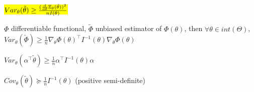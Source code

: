 \begin{cor}
    \hl{$Var_{\theta}(\tilde\theta) \geq \frac{(\dv{\theta}\mathbb{E}_{\theta}(\tilde\theta))^2}{nI(\theta)}$}
\end{cor}

\begin{prop}
    $\Phi$ differentiable functional, $\tilde\Phi$ unbiased estimator of $\Phi(\theta)$, then $\forall \theta \in int(\Theta)$,
    $Var_\theta(\tilde\Phi) \geq \frac{1}{n} \nabla_\theta\Phi(\theta)^\top I^{-1}(\theta) \nabla_\theta \Phi(\theta)$
\end{prop}

\begin{fact}
    $Var_\theta(\alpha^\top \tilde\theta) \geq \frac{1}{n} \alpha^\top I^{-1}(\theta) \alpha$
\end{fact}

\begin{fact}
    $Cov_{\theta}(\tilde\theta) \succeq \frac{1}{n}I^{-1}(\theta)$ (positive semi-definite)
\end{fact}

